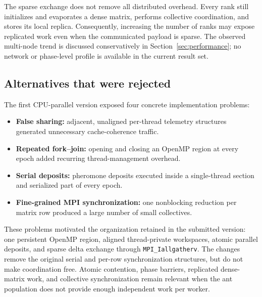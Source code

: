 The sparse exchange does not remove all distributed overhead.  Every rank still initializes and evaporates a dense matrix, performs collective coordination, and stores its local replica.  Consequently, increasing the number of ranks may expose replicated work even when the communicated payload is sparse.  The observed multi-node trend is discussed conservatively in Section~\ref{sec:performance}; no network or phase-level profile is available in the current result set.

\subsection{Alternatives that were rejected}

The first CPU-parallel version exposed four concrete implementation problems:
\begin{itemize}[leftmargin=*,nosep]
    \item \textbf{False sharing:} adjacent, unaligned per-thread telemetry structures generated unnecessary cache-coherence traffic.
    \item \textbf{Repeated fork--join:} opening and closing an OpenMP region at every epoch added recurring thread-management overhead.
    \item \textbf{Serial deposits:} pheromone deposits executed inside a single-thread section and serialized part of every epoch.
    \item \textbf{Fine-grained MPI synchronization:} one nonblocking reduction per matrix row produced a large number of small collectives.
\end{itemize}

These problems motivated the organization retained in the submitted version: one persistent OpenMP region, aligned thread-private workspaces, atomic parallel deposits, and sparse delta exchange through \texttt{MPI\_Iallgatherv}.  The changes remove the original serial and per-row synchronization structures, but do not make coordination free.  Atomic contention, phase barriers, replicated dense-matrix work, and collective synchronization remain relevant when the ant population does not provide enough independent work per worker.

